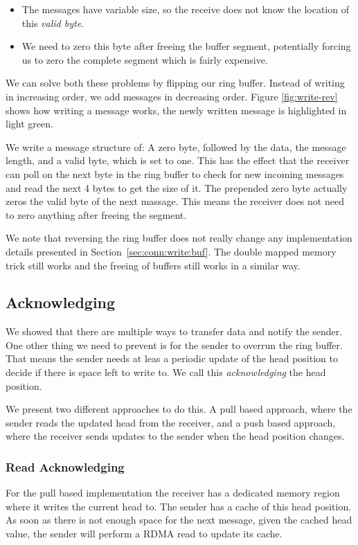 \begin{itemize}
  \item The messages have variable size, so the receive does not know the location of this \emph{valid byte}.
  \item We need to zero this byte after freeing the buffer segment, potentially forcing us to zero the complete segment 
    which is fairly expensive.
\end{itemize}

We can solve both these problems by flipping our ring buffer. Instead of writing in increasing order, we add messages in 
decreasing order. Figure \ref{fig:write-rev} shows how writing a message works, the newly written message is highlighted in 
light green. 

We write a message structure of: 
A zero byte, followed by the data, the message length, and a valid byte, which is set to one. This has the effect that the
receiver can poll on the next byte in the ring buffer to check for new incoming messages and read the next 4 bytes to get 
the size of it. The prepended zero byte actually zeros the valid byte of the next massage. This means the receiver does not 
need to zero anything after freeing the segment.




We note that reversing the ring buffer does not really change any implementation details presented in 
Section~\ref{sec:conn:write:buf}. The double mapped memory trick still works and the freeing of buffers still works in a
similar way.

\subsection{Acknowledging}

We showed that there are multiple ways to transfer data and notify the sender. One other thing we need to prevent is for the
sender to overrun the ring buffer. That means the sender needs at leas a periodic update of the head position to decide if
there is space left to write to. We call this \emph{acknowledging} the head position.

We present two different approaches to do this. A pull based approach, where the sender reads the updated head from the
receiver, and a push based approach, where the receiver sends updates to the sender when the head position changes.

\subsubsection{Read Acknowledging}
For the pull based implementation the receiver has a dedicated memory region where it writes the current 
head to. The sender has a cache of this head position. As soon as there is not enough space for the next message, given 
the cached head value, the sender will perform a RDMA read to update its cache.

